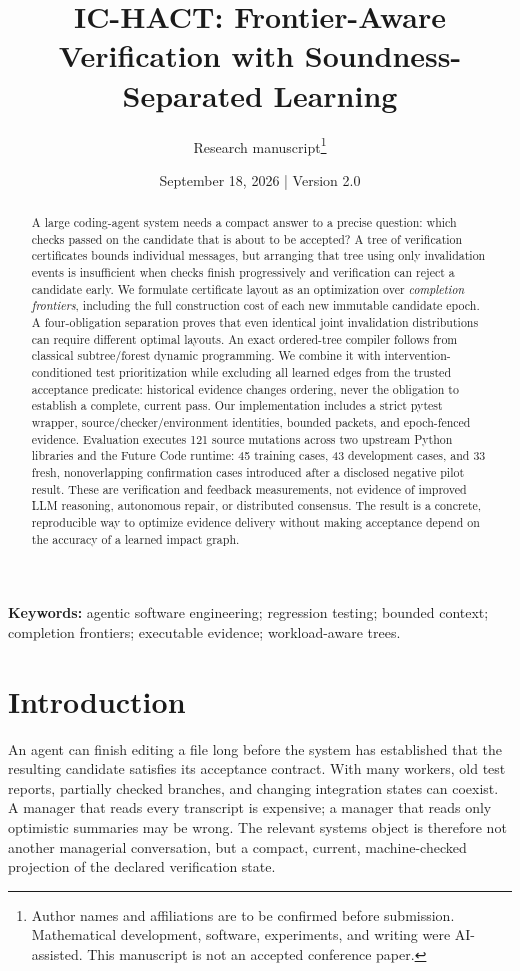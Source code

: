 \documentclass[11pt]{article}
\title{\vspace{-10mm}\textbf{IC-HACT: Frontier-Aware Verification with Soundness-Separated Learning}}
\author{Research manuscript\thanks{Author names and affiliations are to be confirmed before submission. Mathematical development, software, experiments, and writing were AI-assisted. This manuscript is not an accepted conference paper.}}
\date{September 18, 2026 \quad | \quad Version 2.0}
\theoremstyle{definition}\newtheorem{definition}[theorem]{Definition}
\theoremstyle{remark}\newtheorem{remark}[theorem]{Remark}
\begin{document}
\maketitle
\begin{abstract}
A large coding-agent system needs a compact answer to a precise question: which checks passed on the candidate that is about to be accepted? A tree of verification certificates bounds individual messages, but arranging that tree using only invalidation events is insufficient when checks finish progressively and verification can reject a candidate early. We formulate certificate layout as an optimization over \emph{completion frontiers}, including the full construction cost of each new immutable candidate epoch. A four-obligation separation proves that even identical joint invalidation distributions can require different optimal layouts. An exact ordered-tree compiler follows from classical subtree/forest dynamic programming. We combine it with intervention-conditioned test prioritization while excluding all learned edges from the trusted acceptance predicate: historical evidence changes ordering, never the obligation to establish a complete, current pass. Our implementation includes a strict pytest wrapper, source/checker/environment identities, bounded packets, and epoch-fenced evidence. Evaluation executes 121 source mutations across two upstream Python libraries and the Future Code runtime: 45 training cases, 43 development cases, and 33 fresh, nonoverlapping confirmation cases introduced after a disclosed negative pilot result.  These are verification and feedback measurements, not evidence of improved LLM reasoning, autonomous repair, or distributed consensus. The result is a concrete, reproducible way to optimize evidence delivery without making acceptance depend on the accuracy of a learned impact graph.
\end{abstract}
\noindent\textbf{Keywords:} agentic software engineering; regression testing; bounded context; completion frontiers; executable evidence; workload-aware trees.

\section{Introduction}
An agent can finish editing a file long before the system has established that the resulting candidate satisfies its acceptance contract. With many workers, old test reports, partially checked branches, and changing integration states can coexist. A manager that reads every transcript is expensive; a manager that reads only optimistic summaries may be wrong. The relevant systems object is therefore not another managerial conversation, but a compact, current, machine-checked projection of the declared verification state.
\end{document}
